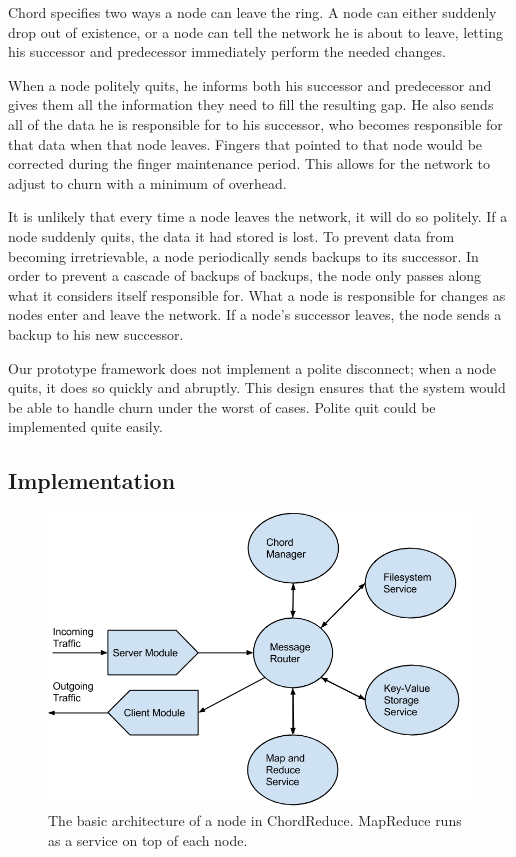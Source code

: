 \documentclass[10pt, conference, compsocconf]{IEEEtran}
\begin{document}
Chord specifies two ways a node can leave the ring.  A node can either suddenly drop out of existence, or a node can tell the network he is about to leave, letting his successor and predecessor immediately perform the needed changes.

When a node politely quits, he informs both his successor and predecessor and gives them all the information they need to fill the resulting gap. He also sends all of the data he is responsible for to his successor, who becomes responsible for that data when that node leaves.  Fingers that pointed to that node would be corrected during the finger maintenance period.  This allows for the network to adjust to churn with a minimum of overhead.

It is unlikely that every time a node leaves the network, it will do so politely.  If a node suddenly quits, the data it had stored is lost. To prevent data from becoming irretrievable, a node periodically sends backups to its successor.  In order to prevent a cascade of backups of backups, the node only passes along what it considers itself responsible for.  What a node is responsible for changes as nodes enter and leave the network.  If a node's successor leaves, the node sends a backup to his new successor. 

Our prototype framework does not implement a polite disconnect;  when a node quits, it does so quickly and abruptly.  This design ensures that the  system would be able to handle churn under the worst of cases.  Polite quit could be implemented quite easily.


\subsection{Implementation}

\begin{figure}
    \includegraphics[width=\linewidth]{crArch}
    \caption{The basic architecture of a node in ChordReduce.  MapReduce runs as a service on top of each node.}
    \label{crArch}
\end{figure}
\end{document}
